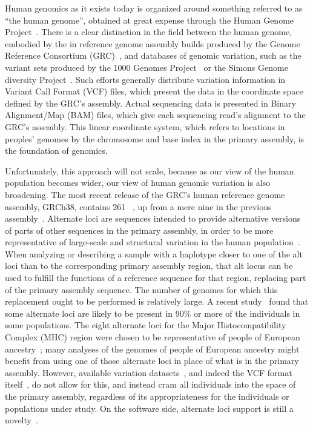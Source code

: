 Human genomics as it exists today is organized around something referred to as ``the human genome'', obtained at great expense through the Human Genome Project~\cite{powledge2003human}. There is a clear distinction in the field between the human genome, embodied by the  in reference genome assembly builds produced by the Genome Reference Consortium (GRC)~\cite{schneider2013genome}, and databases of genomic variation, such as the variant sets produced by the 1000 Genomes Project~\cite{10002015global} or the Simons Genome diversity Project~\cite{simons2014simons,simons2017simons}. Such efforts generally distribute variation information in Variant Call Format (VCF) files, which present the data in the coordinate space defined by the GRC's assembly. Actual sequencing data is presented in Binary Alignment/Map (BAM) files, which give each sequencing read's alignment to the GRC's assembly. This linear coordinate system, which refers to locations in peoples' genomes by the chromosome and base index in the primary assembly, is the foundation of genomics.

Unfortunately, this approach will not scale, because as our view of the human population becomes wider, our view of human genomic variation is also broadening. The most recent release of the GRC's human reference genome assembly, GRCh38, contains 261 ~\cite{grc2013announcing}, up from a mere nine in the previous assembly~\cite{grc2009grch37}. Alternate loci are sequences intended to provide alternative versions of parts of other sequences in the primary assembly, in order to be more representative of large-scale and structural variation in the human population~\cite{karolchik2014new}. When analyzing or describing a sample with a haplotype closer to one of the alt loci than to the corresponding primary assembly region, that alt locus can be used to fulfill the functions of a reference sequence for that region, replacing part of the primary assembly sequence. The number of genomes for which this replacement ought to be performed is relatively large. A recent study~\cite{jager2016alternate} found that some alternate loci are likely to be present in 90\% or more of the individuals in some populations. The eight alternate loci for the Major Histocompatibility Complex (MHC) region were chosen to be representative of people of European ancestry~\cite{horton2008variation}; many analyses of the genomes of people of European ancestry might benefit from using one of those alternate loci in place of what is in the primary assembly. However, available variation datasets~\cite{10002015global}, and indeed the VCF format itself~\cite{danecek2011variant,marshall2013variant}, do not allow for this, and instead cram all individuals into the space of the primary assembly, regardless of its appropriateness for the individuals or populations under study. On the software side, alternate loci support is still a novelty~\cite{jager2016alternate}.

